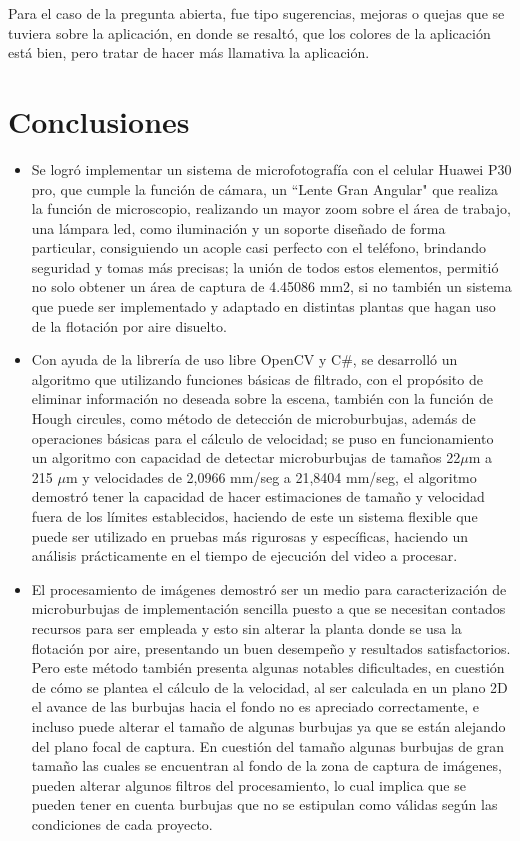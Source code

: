 \documentclass[12pt,twocolumn,a4paper]{article}
\begin{document}
Para el caso de la pregunta abierta, fue tipo sugerencias, mejoras o quejas que se tuviera sobre la aplicación, en donde se resaltó, que los colores de la aplicación está bien, pero tratar de hacer más llamativa la aplicación.


\section{Conclusiones }
\begin{itemize}
\item Se logró implementar un sistema de microfotografía con el celular Huawei P30 pro, que cumple la función de  cámara, un “Lente Gran Angular" que realiza la función de microscopio, realizando un mayor zoom sobre el área de trabajo, una lámpara led, como iluminación y un soporte diseñado de forma particular, consiguiendo un acople casi perfecto con el teléfono, brindando seguridad y tomas más precisas; la unión de todos estos elementos, permitió no solo obtener un área de captura de  4.45086 mm2, si no también un sistema que puede ser implementado y adaptado en distintas plantas que hagan uso de la flotación por aire disuelto.
\item Con ayuda de la librería de uso libre OpenCV  y C\#, se desarrolló un algoritmo que utilizando funciones básicas de filtrado, con el propósito de eliminar información no deseada sobre la escena,   también con la función de Hough circules, como método de detección de microburbujas, además de operaciones básicas para el cálculo de velocidad; se puso en funcionamiento un algoritmo con capacidad de detectar microburbujas de tamaños 22$\mu$m a 215 $\mu$m  y velocidades de 2,0966 mm/seg a  21,8404 mm/seg, el algoritmo demostró tener la capacidad de hacer estimaciones de tamaño y velocidad fuera de los límites establecidos, haciendo de este un sistema flexible que puede ser utilizado en pruebas más rigurosas y específicas, haciendo un análisis prácticamente en el tiempo de ejecución del video a procesar.
\item El procesamiento de imágenes demostró ser un medio para caracterización de microburbujas de implementación sencilla puesto a que se necesitan contados recursos para ser empleada y esto sin alterar la planta donde se usa la flotación por aire, presentando un buen desempeño y resultados satisfactorios. Pero este método también presenta algunas notables dificultades, en cuestión de cómo se plantea el cálculo de la velocidad, al ser calculada en un plano 2D el avance de las burbujas hacia el fondo no es apreciado correctamente, e incluso puede alterar el tamaño de algunas burbujas ya que se están alejando del plano focal de captura. En cuestión del tamaño algunas burbujas de gran tamaño las cuales se encuentran al fondo de la zona de captura de imágenes, pueden alterar algunos filtros del procesamiento, lo cual implica que se pueden tener en cuenta burbujas que no se estipulan como válidas según las condiciones de cada proyecto.

\end{itemize}
\end{document}
